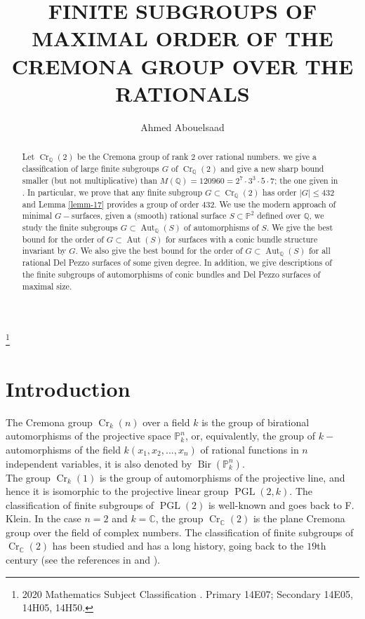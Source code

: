 \documentclass[leqno,12pt]{amsart} %
\renewcommand{\thefootnote}{} %
\newcommand{\Q}{\ensuremath{\mathbb{Q} }}
\newcommand{\C}{\ensuremath{\mathbb{C} }}
\newcommand{\p}{\ensuremath{\mathbb{P} }}
\DeclareMathOperator{\PGL}{PGL}
\DeclareMathOperator{\Aut}{Aut}
\DeclareMathOperator{\Bir}{Bir}
\DeclareMathOperator{\Cr}{Cr}
\begin{document}
\author{Ahmed Abouelsaad}
\pagestyle{myheadings}
\title{\uppercase{Finite subgroups of maximal order of the Cremona group over the rationals}} %
 
\renewcommand{\thefootnote}{\fnsymbol{footnote}}
\footnote[0]{2020  Mathematics Subject Classification . Primary 14E07; Secondary 14E05, 14H05, 14H50.}
 
\maketitle 
\begin{abstract}
Let $\Cr_\Q(2)$ be the Cremona group of rank $2$ over rational numbers. we give a classification of large finite subgroups $G$ of $\Cr_\Q(2)$ and give a new sharp bound smaller (but not multiplicative) than $M(\Q)=120960 = 2^7\cdot3^3\cdot5\cdot7$; the one given in \cite{MR2567402}. In particular, we prove that any finite subgroup $G \subset\Cr_\Q(2)$ has order $\mid G\mid \le  432$ and Lemma \ref{lemm-17} provides a group of order $432$. We use the modern approach of minimal $G-$surfaces, given a (smooth) rational surface $S\subset\p^2$ defined over $\Q$, we study the finite subgroups $G \subset \Aut_{\Q}(S)$ of automorphisms of $S$.  We give the best bound for the order of $G\subset\Aut(S)$ for surfaces with a conic bundle structure invariant by $G$. We also give the best bound for the order of $G\subset \Aut_\Q(S)$ for all rational Del Pezzo surfaces of some given degree. In addition, we give descriptions of the finite subgroups of automorphisms of conic bundles and Del Pezzo surfaces of maximal size.
\end{abstract}
\section{Introduction}
The Cremona group $\Cr_k(n)$ over a field $k$ is the group of birational automorphisms of the projective space $\p^n_k$, or, equivalently, the group of $k-$automorphisms of the field $k(x_1, x_2, . . . , x_n)$ of rational functions in $n$ independent variables, it is also denoted by $\Bir(\p^n_k)$.\\


  
The group $\Cr_k(1)$ is the group of automorphisms of the projective line, and hence it is isomorphic to the projective linear group $\PGL(2,k)$. The classification of finite subgroups of $\PGL(2)$ is well-known and goes back to F. Klein. In the case $n = 2$ and $k=\C$, the group $\Cr_{\C}(2)$ is the plane Cremona group over the field of complex numbers.  The classification of finite subgroups of $\Cr_{\C}(2)$ has been studied and has a long history, going back to the $19$th century (see the references in \cite{MR2286582} and \cite{MR2641179}).\\
\end{document}
